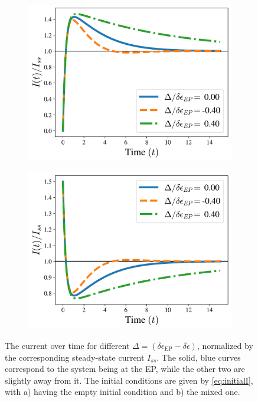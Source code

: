 \documentclass[../main.tex]{subfiles}
\begin{document}
\begin{figure}[H]
\centering
\begin{subfigure}[t]{.5\textwidth}
  \centering
  \includegraphics[width=\linewidth]{figures/diffde_empty.png}
  \caption{}
  \label{fig:diffde1}
\end{subfigure}%
\begin{subfigure}[t]{.5\textwidth}
  \centering
  \includegraphics[width=\linewidth]{figures/diffde_mixed.png}
  \caption{}
  \label{fig:diffde2}
\end{subfigure}
\caption{The current over time for different $\Delta = (\delta\epsilon_\text{EP} - \delta\epsilon)$, normalized by the corresponding steady-state current $I_{ss}$. The solid, blue curves correspond to the system being at the EP, while the other two are slightly away from it. The initial conditions are given by \cref{eq:initialI}, with a) having the empty initial condition and b) the mixed one.}
\label{fig:diffI}
\end{figure}
\end{document}
